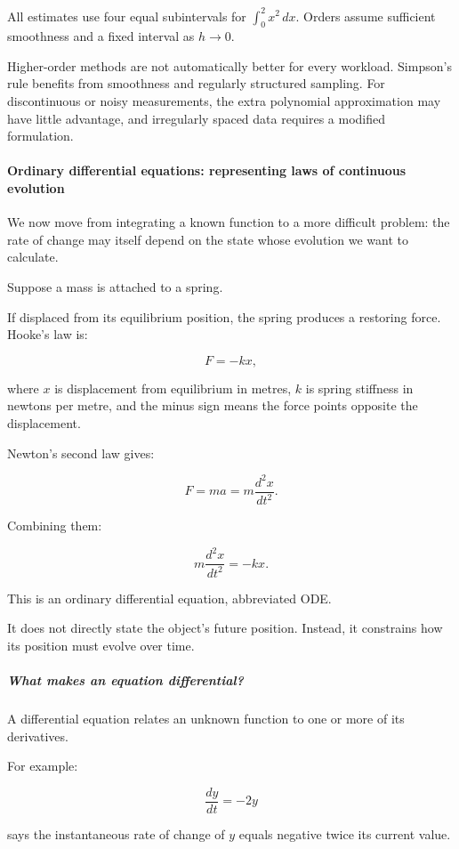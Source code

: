 All estimates use four equal subintervals for \(\int_0^2x^2\,dx\). Orders assume sufficient smoothness and a fixed interval as \(h\to0\).

Higher-order methods are not automatically better for every workload. Simpson's rule benefits from smoothness and regularly structured sampling. For discontinuous or noisy measurements, the extra polynomial approximation may have little advantage, and irregularly spaced data requires a modified formulation.

\paragraph{Ordinary differential equations: representing laws of continuous evolution}\label{ordinary-differential-equations-representing-laws-of-continuous-evolution}

We now move from integrating a known function to a more difficult problem: the rate of change may itself depend on the state whose evolution we want to calculate.

Suppose a mass is attached to a spring.

If displaced from its equilibrium position, the spring produces a restoring force. Hooke's law is:

\[
F=-kx,
\]

where \(x\) is displacement from equilibrium in metres, \(k\) is spring stiffness in newtons per metre, and the minus sign means the force points opposite the displacement.

Newton's second law gives:

\[
F=ma=m\frac{d^2x}{dt^2}.
\]

Combining them:

\[
\boxed{m\frac{d^2x}{dt^2}=-kx}.
\]

This is an ordinary differential equation, abbreviated ODE.

It does not directly state the object's future position. Instead, it constrains how its position must evolve over time.

\subparagraph{What makes an equation differential?}\label{what-makes-an-equation-differential}

A differential equation relates an unknown function to one or more of its derivatives.

For example:

\[
\frac{dy}{dt}=-2y
\]

says the instantaneous rate of change of \(y\) equals negative twice its current value.

